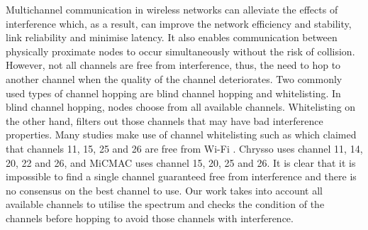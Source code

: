 Multichannel communication in wireless networks can alleviate the effects of interference which, as a result, can improve the network efficiency and stability, link reliability and minimise latency. It also enables communication between physically proximate nodes to occur simultaneously without the risk of collision. However, not all channels are free from interference, thus, the need to hop to another channel when the quality of the channel deteriorates. Two commonly used types of channel hopping \cite{watteyne} are blind channel hopping and whitelisting. In blind channel hopping, nodes choose from all available channels. Whitelisting on the other hand, filters out those channels that may have bad interference properties. Many studies make use of channel whitelisting such as \cite{watteyne} which claimed that channels 11, 15, 25 and 26 are free from Wi-Fi \cite{wu}. Chrysso \cite{chrysso} uses channel 11, 14, 20, 22 and 26, and MiCMAC \cite{micmac} uses channel 15, 20, 25 and 26. It is clear that it 
is impossible to find a single channel guaranteed free from interference and there is no consensus on the best channel to use. Our work takes into account all available channels to utilise the spectrum and checks the condition of the channels before hopping to avoid those channels with interference.





